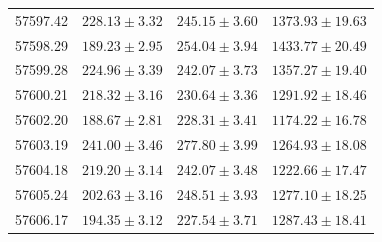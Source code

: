 \begin{table}[h]
\begin{tabular}{lccc}
		57597.42 & $228.13 \pm 3.32$ & $245.15 \pm 3.60$ & $1373.93 \pm 19.63$ \\
		57598.29 & $189.23 \pm 2.95$ & $254.04 \pm 3.94$ & $1433.77 \pm 20.49$ \\
		57599.28 & $224.96 \pm 3.39$ & $242.07 \pm 3.73$ & $1357.27 \pm 19.40$ \\
		57600.21 & $218.32 \pm 3.16$ & $230.64 \pm 3.36$ & $1291.92 \pm 18.46$ \\
		57602.20 & $188.67 \pm 2.81$ & $228.31 \pm 3.41$ & $1174.22 \pm 16.78$ \\
		57603.19 & $241.00 \pm 3.46$ & $277.80 \pm 3.99$ & $1264.93 \pm 18.08$ \\
		57604.18 & $219.20 \pm 3.14$ & $242.07 \pm 3.48$ & $1222.66 \pm 17.47$ \\
		57605.24 & $202.63 \pm 3.16$ & $248.51 \pm 3.93$ & $1277.10 \pm 18.25$ \\
		57606.17 & $194.35 \pm 3.12$ & $227.54 \pm 3.71$ & $1287.43 \pm 18.41$ \\
		\hline
	\end{tabular}
	\label{tab:uv}
\end{table}

